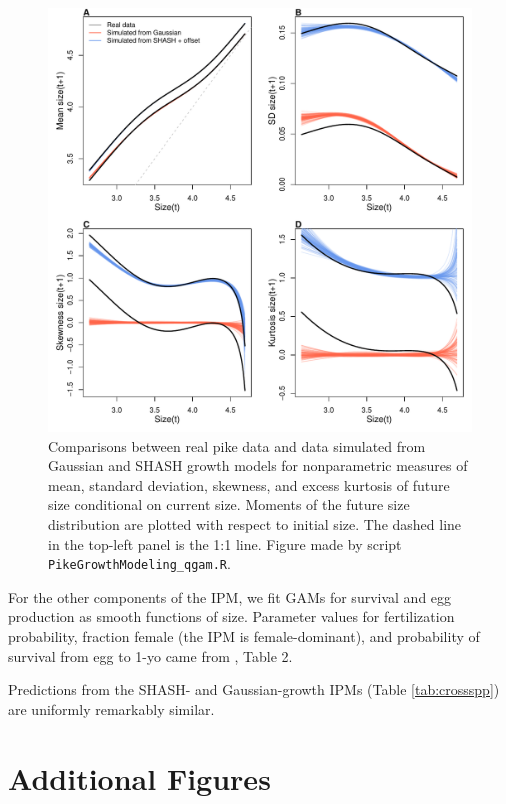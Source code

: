 \documentclass[12pt]{article}
\begin{document}
\begin{spacing}{1.35}
	\begin{figure}[tbp]
		\centering
		\includegraphics[width=1.0\textwidth]{figures/pike_SHASH_fit.pdf}
		\caption{Comparisons between real pike data and data simulated from Gaussian and SHASH growth models for nonparametric measures of mean, standard deviation, 
			skewness, and excess kurtosis of future size conditional on current size. 
			Moments of the future size distribution are plotted with respect to initial size. The dashed line in the top-left panel is the 1:1 line. 
			Figure made by script \texttt{PikeGrowthModeling\_qgam.R}.}
		\label{fig:pikeSims}
	\end{figure} 
	
	For the other components of the IPM, we fit GAMs for survival and egg production as smooth functions of size. 
	Parameter values for fertilization probability, fraction female (the IPM is female-dominant), and probability of survival from egg to 1-yo 
	came from \cite{stubberud2019effects}, Table 2. 
	
	Predictions from the SHASH- and Gaussian-growth IPMs (Table \ref{tab:crossspp}) are uniformly remarkably similar. 
	
	\clearpage 
	
	\section{Additional Figures}
	\label{sec:additionalFigs}
	

\end{spacing}
\end{document}
